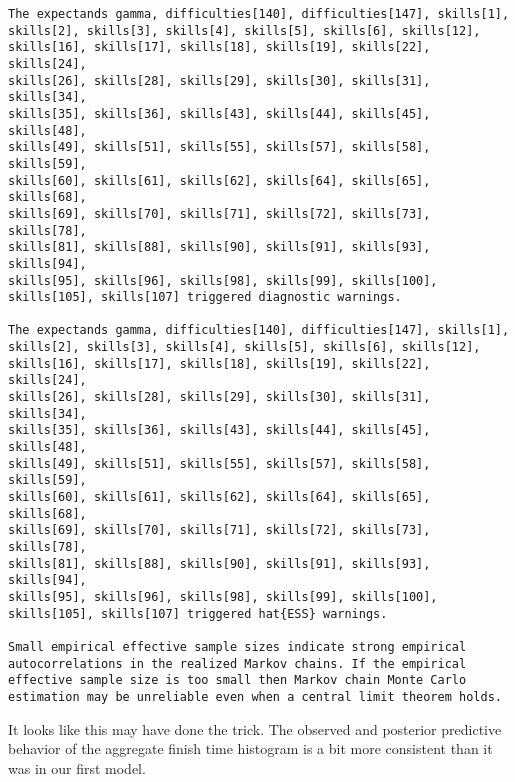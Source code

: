 \documentclass[
  letterpaper,
  DIV=11,
  numbers=noendperiod]{scrartcl}
\newenvironment{Shaded}{\begin{snugshade}}{\end{snugshade}}
\newcommand{\AttributeTok}[1]{\textcolor[rgb]{0.40,0.45,0.13}{#1}}
\newcommand{\DecValTok}[1]{\textcolor[rgb]{0.68,0.00,0.00}{#1}}
\newcommand{\FunctionTok}[1]{\textcolor[rgb]{0.28,0.35,0.67}{#1}}
\newcommand{\NormalTok}[1]{\textcolor[rgb]{0.00,0.23,0.31}{#1}}
\newcommand{\SpecialCharTok}[1]{\textcolor[rgb]{0.37,0.37,0.37}{#1}}
\newcommand{\StringTok}[1]{\textcolor[rgb]{0.13,0.47,0.30}{#1}}
\begin{document}
\begin{verbatim}
The expectands gamma, difficulties[140], difficulties[147], skills[1],
skills[2], skills[3], skills[4], skills[5], skills[6], skills[12],
skills[16], skills[17], skills[18], skills[19], skills[22], skills[24],
skills[26], skills[28], skills[29], skills[30], skills[31], skills[34],
skills[35], skills[36], skills[43], skills[44], skills[45], skills[48],
skills[49], skills[51], skills[55], skills[57], skills[58], skills[59],
skills[60], skills[61], skills[62], skills[64], skills[65], skills[68],
skills[69], skills[70], skills[71], skills[72], skills[73], skills[78],
skills[81], skills[88], skills[90], skills[91], skills[93], skills[94],
skills[95], skills[96], skills[98], skills[99], skills[100],
skills[105], skills[107] triggered diagnostic warnings.

The expectands gamma, difficulties[140], difficulties[147], skills[1],
skills[2], skills[3], skills[4], skills[5], skills[6], skills[12],
skills[16], skills[17], skills[18], skills[19], skills[22], skills[24],
skills[26], skills[28], skills[29], skills[30], skills[31], skills[34],
skills[35], skills[36], skills[43], skills[44], skills[45], skills[48],
skills[49], skills[51], skills[55], skills[57], skills[58], skills[59],
skills[60], skills[61], skills[62], skills[64], skills[65], skills[68],
skills[69], skills[70], skills[71], skills[72], skills[73], skills[78],
skills[81], skills[88], skills[90], skills[91], skills[93], skills[94],
skills[95], skills[96], skills[98], skills[99], skills[100],
skills[105], skills[107] triggered hat{ESS} warnings.

Small empirical effective sample sizes indicate strong empirical
autocorrelations in the realized Markov chains. If the empirical
effective sample size is too small then Markov chain Monte Carlo
estimation may be unreliable even when a central limit theorem holds.
\end{verbatim}

It looks like this may have done the trick. The observed and posterior
predictive behavior of the aggregate finish time histogram is a bit more
consistent than it was in our first model.

\begin{Shaded}
\end{Shaded}
\end{document}
